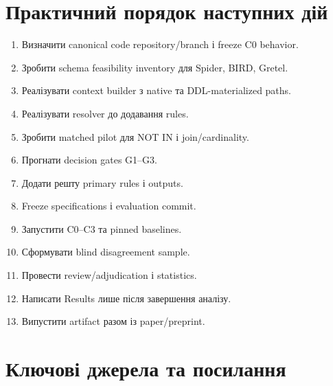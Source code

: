 \documentclass[11pt,a4paper]{article}
\begin{document}
\section{Практичний порядок наступних дій}

\begin{enumerate}
\item Визначити canonical code repository/branch і freeze C0 behavior.
\item Зробити schema feasibility inventory для Spider, BIRD, Gretel.
\item Реалізувати context builder з native та DDL-materialized paths.
\item Реалізувати resolver до додавання rules.
\item Зробити matched pilot для NOT IN і join/cardinality.
\item Прогнати decision gates G1--G3.
\item Додати решту primary rules і outputs.
\item Freeze specifications і evaluation commit.
\item Запустити C0--C3 та pinned baselines.
\item Сформувати blind disagreement sample.
\item Провести review/adjudication і statistics.
\item Написати Results лише після завершення аналізу.
\item Випустити artifact разом із paper/preprint.
\end{enumerate}

\section{Ключові джерела та посилання}
\end{document}
